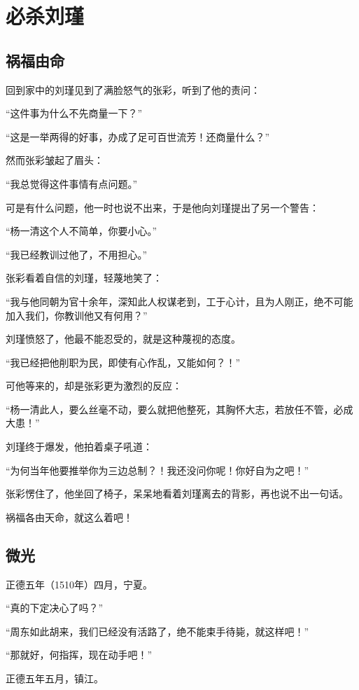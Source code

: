\section{必杀刘瑾}
\ifnum{}
	\begin{multicols}{\theparacolNo}
\fi
\subsection{祸福由命}
回到家中的刘瑾见到了满脸怒气的张彩，听到了他的责问：

“这件事为什么不先商量一下？”

“这是一举两得的好事，办成了足可百世流芳！还商量什么？”

然而张彩皱起了眉头：

“我总觉得这件事情有点问题。”

可是有什么问题，他一时也说不出来，于是他向刘瑾提出了另一个警告：

“杨一清这个人不简单，你要小心。”

“我已经教训过他了，不用担心。”

张彩看着自信的刘瑾，轻蔑地笑了：

“我与他同朝为官十余年，深知此人权谋老到，工于心计，且为人刚正，绝不可能加入我们，你教训他又有何用？”

刘瑾愤怒了，他最不能忍受的，就是这种蔑视的态度。

“我已经把他削职为民，即使有心作乱，又能如何？！”

可他等来的，却是张彩更为激烈的反应：

“杨一清此人，要么丝毫不动，要么就把他整死，其胸怀大志，若放任不管，必成大患！”

刘瑾终于爆发，他拍着桌子吼道：

“为何当年他要推举你为三边总制？！我还没问你呢！你好自为之吧！”

张彩愣住了，他坐回了椅子，呆呆地看着刘瑾离去的背影，再也说不出一句话。

祸福各由天命，就这么着吧！

\subsection{微光}
正德五年（1510年）四月，宁夏。

“真的下定决心了吗？”

“周东如此胡来，我们已经没有活路了，绝不能束手待毙，就这样吧！”

“那就好，何指挥，现在动手吧！”

正德五年五月，镇江。


\end{multicols}

